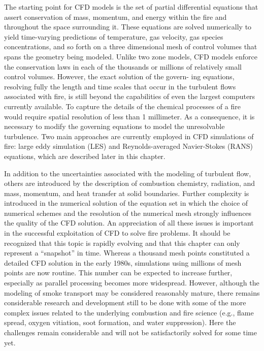 \documentclass[graybox]{svmult}
\begin{document}
The starting point for CFD models is the set of partial differential equations that assert conservation of mass, momentum, and energy within the fire and throughout the space surrounding it. These equations are solved numerically to yield time-varying predictions of temperature,  gas  velocity,  gas species concentrations, and so forth on a three dimensional mesh of control volumes that spans the geometry being modeled. Unlike two zone models, CFD models enforce the conservation laws in each of the thousands or millions of relatively small control volumes. However, the exact solution of the govern- ing equations, resolving fully the length and time scales that occur in the turbulent flows associated with fire, is still beyond the capabilities of even the largest computers currently available. To capture the details of the chemical processes of a fire would require spatial resolution of less than 1 millimeter. As a consequence, it is necessary to modify the governing equations to model the unresolvable turbulence. Two main approaches are currently employed in CFD simulations of fire: large eddy simulation (LES) and Reynolds-averaged Navier-Stokes (RANS) equations, which are described later in this chapter.

In addition to the uncertainties associated with the modeling of turbulent flow, others are introduced by the description of combustion chemistry, radiation, and mass, momentum, and heat transfer at solid boundaries. Further complexity is introduced in the numerical solution of the equation set in which the choice of numerical schemes and the resolution of the numerical mesh strongly influences the quality of the CFD solution. An appreciation of all these issues is important in the successful exploitation of CFD to solve fire problems.
It should be recognized that this topic is rapidly evolving and that this chapter can only represent a ``snapshot'' in time. Whereas a thousand mesh points constituted a detailed CFD solution in the early 1980s, simulations using millions of mesh points are now routine. This number can be expected to increase further, especially as parallel processing becomes more widespread. However, although the modeling of smoke transport may be considered reasonably mature, there remains considerable research and development still to be done with some of the more complex issues related to the underlying combustion and fire science (e.g., flame spread, oxygen vitiation, soot formation, and water suppression). Here the challenges remain considerable and will not be satisfactorily solved for some time yet.
\end{document}
